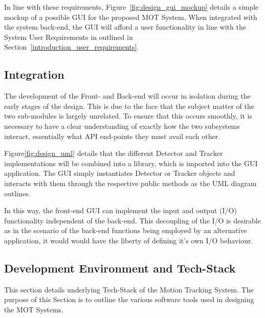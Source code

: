 In line with these requirements, Figure~\ref{fig:design_gui_mockup} details a
simple mockup of a possible GUI for the proposed MOT System. When integrated
with the system back-end, the GUI will afford a user functionality in
line with the System User Requirements in outlined in
Section~\ref{introduction_user_requirements}.


\subsection{Integration}
The development of the Front- and Back-end will occur in isolation during the
early stages of the design. This is due to the face that the subject matter of
the two sub-modules is largely unrelated. To ensure that this occurs smoothly,
it is necessary to have a clear understanding of exactly how the two subsystems
interact, essentially what API end-points they must avail each other.

Figure\ref{fig:design_uml} details that the different Detector and Tracker
implementations will be combined into a library, which is imported into the GUI
application.
The GUI simply instantiates Detector or Tracker objects and interacts with them
through the respective public methods as the UML diagram outlines.

In this way, the front-end GUI can implement the input and output (I/O) functionality
independent of the back-end. This decoupling of the I/O is desirable as in the
scenario of the back-end functions being employed by an alternative application,
it would would have the liberty of defining it's own I/O behaviour. 





\subsection{Development Environment and Tech-Stack}
This section details underlying Tech-Stack of the Motion Tracking System. The
purpose of this Section is to outline the various software tools used in
designing the MOT Systems.




